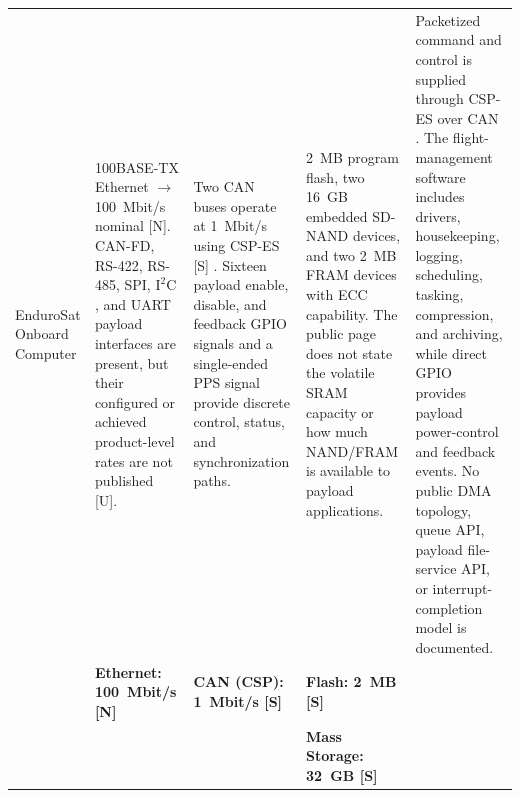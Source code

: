 \documentclass[10pt]{../datasheet}
\let\cite\citep
\begin{document}
\begin{landscape}
\begin{longtable}{|p{3.2cm}|p{4.5cm}|p{4.5cm}|p{4.5cm}|p{5.5cm}|}
    EnduroSat Onboard Computer \cite{endurosat_obc_ds, libcsp_basics}  &
    100BASE-TX Ethernet $\rightarrow$ 100~Mbit/s nominal [N]. CAN-FD, RS-422,
    RS-485, SPI, $\text{I}^2\text{C}$, and UART payload interfaces are present,
    but their configured or achieved product-level rates are not published [U].
                                                                       & Two CAN buses operate at 1~Mbit/s using CSP-ES [S] \cite{libcsp_basics}.
    Sixteen payload enable, disable, and feedback GPIO signals and a
    single-ended PPS signal provide discrete control, status, and
    synchronization paths.                                             &
    2~MB program flash, two 16~GB embedded SD-NAND devices, and two 2~MB FRAM
    devices with ECC capability. The public page does not state the volatile
    SRAM capacity or how much NAND/FRAM is available to payload applications.
                                                                       & Packetized command and control is supplied through CSP-ES over CAN
    \cite{libcsp_basics}. The flight-management software includes drivers,
    housekeeping, logging, scheduling, tasking, compression, and archiving,
    while direct GPIO provides payload power-control and feedback events. No
    public DMA topology, queue API, payload file-service API, or
    interrupt-completion model is documented.
    \\
    \cline{2-5}
                                                                       & \textbf{Ethernet: 100~Mbit/s [N]}
                                                                       & \textbf{CAN (CSP): 1~Mbit/s [S]}
                                                                       & \textbf{Flash: 2~MB [S]}                                                   &                                                                                                \\
                                                                       &                                                                            &                                                  & \textbf{Mass Storage: 32~GB [S]}          & \\ \hline\hline


\end{longtable}
\end{landscape}
\end{document}
